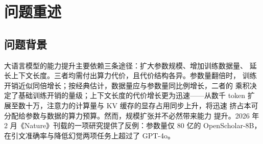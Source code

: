 \documentclass[bwprint]{gmcmthesis}
\numberwithin{equation}{section}
\numberwithin{figure}{section}
\numberwithin{table}{section}
\begin{document}
\begin{abstract}
针对问题四，本文建立了把能力增长分解为规模扩张与非规模技术进步两部分的建模框架，
并给出以 Loss--Benchmark 桥接数据把交叉熵损失翻译为能力得分的技术路线；该问所需的
C 组数据尚未完成建模，本文如实说明其数据要求与识别条件，不给出未经数据支持的结论。

综合来看，本文的方法性贡献有三：其一，把跨来源数据能否合并本身作为受检验的门禁，
而不是默认其可比；其二，对未识别的参数一律报告为未估计，不以待估系数填充结论；
其三，在每一问上都给出失效边界，明确指出结论在何处成立、超出何处失效。主要边界是
质量评分受 7 个语义未追溯字段的约束、配比与质量的独立效应在本数据下不可识别，以及
配比模型不具备跨尺度定量外推能力。


\end{abstract}

\pagestyle{plain}

\maketoc

\clearpage

\section{问题重述}


\subsection{问题背景}

大语言模型的能力提升主要依赖三条途径：扩大参数规模、增加训练数据量、
延长上下文长度。三者均需付出算力代价，且代价结构各异。参数量翻倍时，
训练开销近似同倍增长；按经典估计，数据量应与参数量同比例增长，二者的
乘积决定了基础训练开销的量级；上下文长度的代价增长更为迅速——从数千
token 扩展至数十万，注意力的计算量与 KV 缓存的显存占用同步上升，将迅速
挤占本可分配给参数与数据的算力预算。然而，规模扩张并不必然带来能力
提升。2026 年 2 月《Nature》刊载的一项研究提供了反例：参数量仅 80 亿的
OpenScholar-8B，在引文准确率与降低幻觉两项任务上超过了 GPT-4o。
\end{document}
